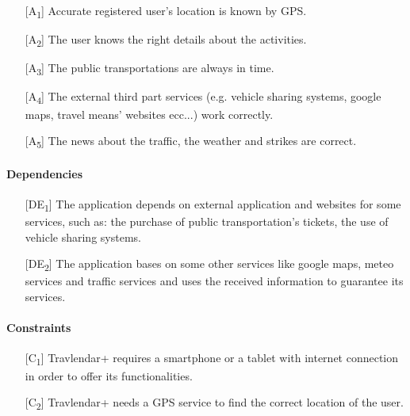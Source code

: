 \documentclass[12pt,titlepage]{article}
\begin{document}
\begin{itemize}
\item [{[A\textsubscript{1}]}]  Accurate registered user's location is known by GPS.
\item [{[A\textsubscript{2}]}] The user knows the right details about the activities.
\item [{[A\textsubscript{3}]}] The public transportations are always in time.
\item [{[A\textsubscript{4}]}] The external third part services (e.g. vehicle sharing systems, google maps, travel means' websites ecc...) work correctly.
\item [{[A\textsubscript{5}]}] The news about the traffic, the weather and strikes are correct.
\end{itemize}

\paragraph{Dependencies}
\begin{itemize}
\item[{[DE\textsubscript{1}]}]  The application depends on external application and websites for some services, such as: the purchase of public transportation's tickets, the use of vehicle sharing systems. 
\item [{[DE\textsubscript{2}]}] The application bases on some other services like google maps, meteo services and traffic services and uses the received information to guarantee its services.
\end{itemize}

\paragraph{Constraints}
\begin{itemize}
\item [{[C\textsubscript{1}]}] Travlendar+ requires a smartphone or a tablet with internet connection in order to offer its functionalities.
\item [{[C\textsubscript{2}]}] Travlendar+ needs a GPS service to find the correct location of the user.

\end{itemize}
\end{document}
